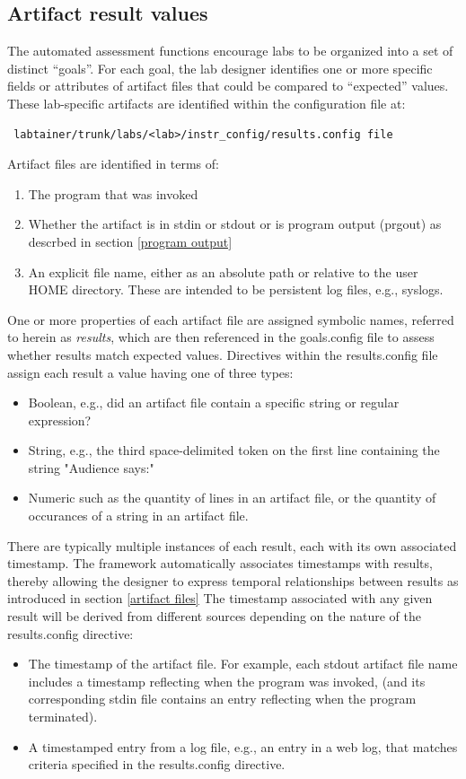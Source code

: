 \documentclass[12pt]{article}
\begin{document}
\subsection{Artifact result values}
\label{results.config}
The automated assessment functions encourage labs to be organized into a set of distinct ``goals''.
For each goal, the lab designer identifies one or more specific fields or attributes of artifact files that
could be compared to ``expected'' values.  These lab-specific artifacts are identified within the
configuration file at:
\begin{verbatim}
 labtainer/trunk/labs/<lab>/instr_config/results.config file
\end{verbatim}
\noindent Artifact files are identified in terms of:
\begin{enumerate}
\item The program that was invoked
\item Whether the artifact is in stdin or stdout or is program output (prgout) as descrbed in section \ref{program output}
\item An explicit file name, either as an absolute path or relative to the user HOME directory.  These are intended
to be persistent log files, e.g., syslogs.
\end{enumerate}

One or more properties of each artifact file are assigned symbolic names, referred to herein as \textit{results}, which 
are then referenced in the goals.config file to assess whether results match expected values.  Directives within the
results.config file assign each result a value having one of three types:
\begin{itemize}
\item Boolean, e.g., did an artifact file contain a specific string or regular expression?
\item String, e.g., the third space-delimited token on the first line containing the string "Audience says:"
\item Numeric such as the quantity of lines in an artifact file, or the quantity of occurances of a string in an artifact file.
\end{itemize} 

There are typically multiple instances of each result, each with its own associated timestamp. The framework automatically
associates timestamps with results, thereby allowing the designer to express temporal relationships between results
as introduced in section \ref{artifact files} The timestamp associated with any given result will be derived from different
sources depending on the nature of the results.config directive:
\begin{itemize}
\item The timestamp of the artifact file.  For example, each stdout artifact file name includes a timestamp reflecting when the
program was invoked, (and its corresponding stdin file contains an entry reflecting when the program terminated).
\item A timestamped entry from a log file, e.g., an entry in a web log, that matches criteria specified in the results.config
directive.
\end{itemize}
\end{document}

